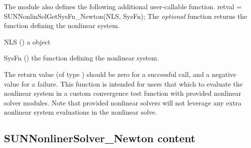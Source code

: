 The {\sunnonlinsolnewton} module also defines the following additional
user-callable function.
{
  retval = SUNNonlinSolGetSysFn\_Newton(NLS, SysFn);
}
{
  The \textit{optional} function 
  returns the function defining the nonlinear system.
}
{
  \begin{args}[SysFn]
  \item[NLS] ()
    a {\sunnonlinsol} object
  \item[SysFn] ()
    the function defining the nonlinear system.
  \end{args}
}
{
  The return value  (of type ) should be zero for a
  successful call, and a negative value for a failure.
}
{
  This function is intended for users that which to evaluate the
  nonlinear system in a custom convergence test function with
  {\sundials} provided nonlinear solver modules. Note that {\sundials}
  provided nonlinear solvers will not leverage any extra nonlinear
  system evaluations in the nonlinear solve.
}


\subsection{SUNNonlinerSolver\_Newton content}
\label{ss:sunnonlinsolnewton_content}

